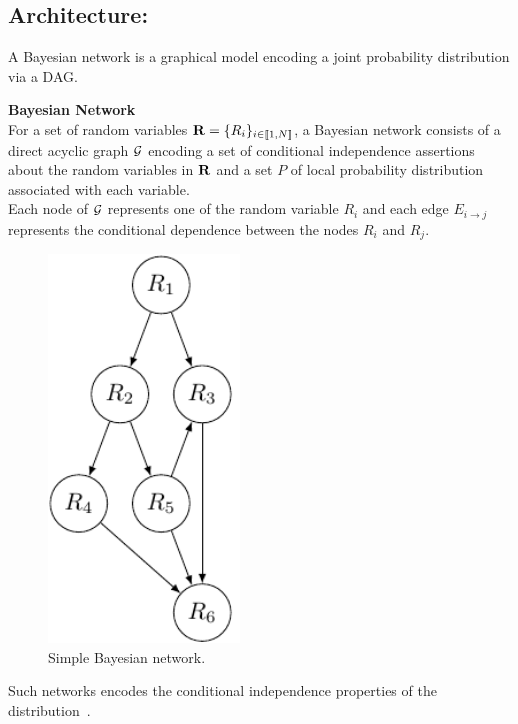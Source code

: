 \documentclass[a4paper,11pt]{report}
\begin{document}
    \subsection{Architecture:}
      \label{subsec:PGMs/BN/Architecture}
      
      A Bayesian network is a graphical model encoding a joint probability distribution via a DAG.
      
      \begin{defn} \textbf{Bayesian Network}\\
				For a set of random variables ${\bf R} = \{R_{i}\}_{i \in \llbracket1,N \rrbracket}$, a Bayesian network consists of a direct acyclic graph $\mathcal{G}$ encoding a set of conditional independence assertions about the random variables in ${\bf R}$ and  a set $P$ of local probability distribution associated with each variable.\\
				Each node of $\mathcal{G}$ represents one of the random variable $R_{i}$ and each edge $E_{i \rightarrow j}$ represents the conditional dependence between the nodes $R_{i}$ and $R_{j}$.
				\label{def:BN}
      \end{defn}
     
			\begin{figure}[h]
				\begin{center}
					\includegraphics[width=2in]{bn_simple_crop.pdf}
					\caption{Simple Bayesian network.} 
					\label{fig:Eg BN}
				\end{center}
			\end{figure}

			Such networks encodes the conditional independence properties of the distribution~\citep{nilsson1998artificial}.
			
\end{document}
